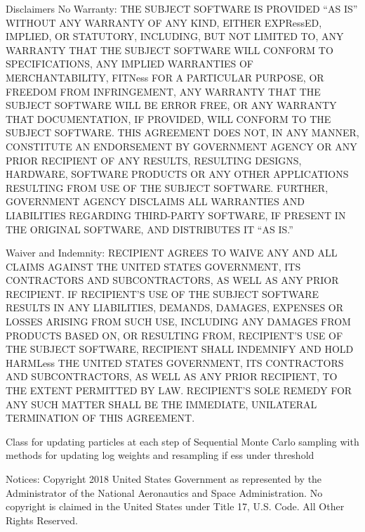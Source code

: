 \documentclass[letterpaper,10pt,english]{sphinxmanual}
\begin{document}
Disclaimers
No Warranty: THE SUBJECT SOFTWARE IS PROVIDED “AS IS” WITHOUT ANY WARRANTY OF
ANY KIND, EITHER EXPRessED, IMPLIED, OR STATUTORY, INCLUDING, BUT NOT LIMITED
TO, ANY WARRANTY THAT THE SUBJECT SOFTWARE WILL CONFORM TO SPECIFICATIONS, ANY
IMPLIED WARRANTIES OF MERCHANTABILITY, FITNess FOR A PARTICULAR PURPOSE, OR
FREEDOM FROM INFRINGEMENT, ANY WARRANTY THAT THE SUBJECT SOFTWARE WILL BE ERROR
FREE, OR ANY WARRANTY THAT DOCUMENTATION, IF PROVIDED, WILL CONFORM TO THE
SUBJECT SOFTWARE. THIS AGREEMENT DOES NOT, IN ANY MANNER, CONSTITUTE AN
ENDORSEMENT BY GOVERNMENT AGENCY OR ANY PRIOR RECIPIENT OF ANY RESULTS,
RESULTING DESIGNS, HARDWARE, SOFTWARE PRODUCTS OR ANY OTHER APPLICATIONS
RESULTING FROM USE OF THE SUBJECT SOFTWARE.  FURTHER, GOVERNMENT AGENCY
DISCLAIMS ALL WARRANTIES AND LIABILITIES REGARDING THIRD-PARTY SOFTWARE, IF
PRESENT IN THE ORIGINAL SOFTWARE, AND DISTRIBUTES IT “AS IS.”

Waiver and Indemnity:  RECIPIENT AGREES TO WAIVE ANY AND ALL CLAIMS AGAINST THE
UNITED STATES GOVERNMENT, ITS CONTRACTORS AND SUBCONTRACTORS, AS WELL AS ANY
PRIOR RECIPIENT.  IF RECIPIENT’S USE OF THE SUBJECT SOFTWARE RESULTS IN ANY
LIABILITIES, DEMANDS, DAMAGES, EXPENSES OR LOSSES ARISING FROM SUCH USE,
INCLUDING ANY DAMAGES FROM PRODUCTS BASED ON, OR RESULTING FROM, RECIPIENT’S
USE OF THE SUBJECT SOFTWARE, RECIPIENT SHALL INDEMNIFY AND HOLD HARMLess THE
UNITED STATES GOVERNMENT, ITS CONTRACTORS AND SUBCONTRACTORS, AS WELL AS ANY
PRIOR RECIPIENT, TO THE EXTENT PERMITTED BY LAW.  RECIPIENT’S SOLE REMEDY FOR
ANY SUCH MATTER SHALL BE THE IMMEDIATE, UNILATERAL TERMINATION OF THIS
AGREEMENT.

\begin{fulllineitems}
\label{\detokenize{source_code:smcpy.smc.particle_updater.ParticleUpdater}}
Class for updating particles at each step of Sequential Monte Carlo sampling
with methods for updating log weights and resampling if ess under threshold

\end{fulllineitems}

\label{\detokenize{source_code:module-smcpy.smc.particle_mutator}}
Notices:
Copyright 2018 United States Government as represented by the Administrator of
the National Aeronautics and Space Administration. No copyright is claimed in
the United States under Title 17, U.S. Code. All Other Rights Reserved.
\end{document}
